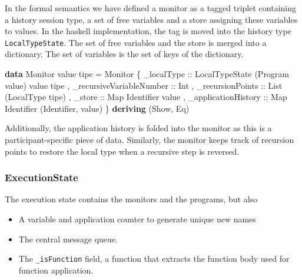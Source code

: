 \documentclass[runningheads]{llncs}
\providecommand{\tightlist}{%
  \setlength{\itemsep}{0pt}\setlength{\parskip}{0pt}}
\newenvironment{Shaded}{}{}
\newcommand{\KeywordTok}[1]{\textcolor[rgb]{0.00,0.44,0.13}{\textbf{#1}}}
\newcommand{\DataTypeTok}[1]{\textcolor[rgb]{0.56,0.13,0.00}{#1}}
\newcommand{\OtherTok}[1]{\textcolor[rgb]{0.00,0.44,0.13}{#1}}
\newcommand{\FunctionTok}[1]{\textcolor[rgb]{0.02,0.16,0.49}{#1}}
\newcommand{\NormalTok}[1]{#1}
\begin{document}
In the formal semantics we have defined a monitor as a tagged triplet
containing a history session type, a set of free variables and a store
assigning these variables to values. In the haskell implementation, the
tag is moved into the history type \texttt{LocalTypeState}. The set of
free variables and the store is merged into a dictionary. The set of
variables is the set of keys of the dictionary.

\begin{Shaded}
\begin{Highlighting}[]
\KeywordTok{data} \DataTypeTok{Monitor}\NormalTok{ value tipe }\FunctionTok{=} 
    \DataTypeTok{Monitor} 
\NormalTok{        \{}\OtherTok{ _localType ::} \DataTypeTok{LocalTypeState}\NormalTok{ (}\DataTypeTok{Program}\NormalTok{ value) value tipe}
\NormalTok{        ,}\OtherTok{ _recursiveVariableNumber ::} \DataTypeTok{Int}
\NormalTok{        ,}\OtherTok{ _recursionPoints ::} \DataTypeTok{List}\NormalTok{ (}\DataTypeTok{LocalType}\NormalTok{ tipe)}
\NormalTok{        ,}\OtherTok{ _store ::} \DataTypeTok{Map} \DataTypeTok{Identifier}\NormalTok{ value }
\NormalTok{        ,}\OtherTok{ _applicationHistory ::} \DataTypeTok{Map} \DataTypeTok{Identifier}\NormalTok{ (}\DataTypeTok{Identifier}\NormalTok{, value)}
\NormalTok{        \}}
        \KeywordTok{deriving}\NormalTok{ (}\DataTypeTok{Show}\NormalTok{, }\DataTypeTok{Eq}\NormalTok{)}
\end{Highlighting}
\end{Shaded}

Additionally, the application history is folded into the monitor as this
is a participant-specific piece of data. Similarly, the monitor keeps
track of recursion points to restore the local type when a recursive
step is reversed.

\subsubsection{ExecutionState}\label{executionstate}

The execution state contains the monitors and the programs, but also

\begin{itemize}
\tightlist
\item
  A variable and application counter to generate unique new names
\item
  The central message queue.
\item
  The \texttt{\_isFunction} field, a function that extracts the function
  body used for function application.
\end{itemize}
\end{document}
